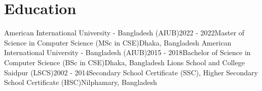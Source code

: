 \section{Education}
\resumeSubHeadingListStart
\resumeSubheading
{American International University - Bangladesh (AIUB)}{2022 - 2022}{Master of Science in Computer Science (MSc in CSE)}{Dhaka, Bangladesh}
\resumeSubheading
{American International University - Bangladesh (AIUB)}{2015 - 2018}{Bachelor of Science in Computer Science (BSc in CSE)}{Dhaka, Bangladesh}
\resumeSubheading
{Lions School and College Saidpur (LSCS)}{2002 - 2014}{Secondary School Certificate (SSC), Higher Secondary School Certificate (HSC)}{Nilphamary, Bangladesh}
\resumeSubHeadingListEnd
